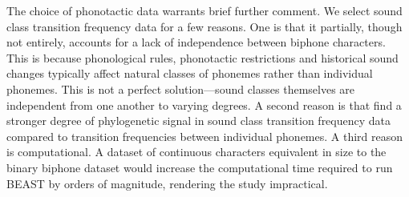 \documentclass[]{article}
\begin{document}
The choice of phonotactic data warrants brief further comment. We select sound class transition frequency data for a few reasons. One is that it partially, though not entirely, accounts for a lack of independence between biphone characters. This is because phonological rules, phonotactic restrictions and historical sound changes typically affect natural classes of phonemes rather than individual phonemes. This is not a perfect solution---sound classes themselves are independent from one another to varying degrees. A second reason is that \textcite{macklin-cordes_phylogenetic_2020} find a stronger degree of phylogenetic signal in sound class transition frequency data compared to transition frequencies between individual phonemes. A third reason is computational. A dataset of continuous characters equivalent in size to the binary biphone dataset would increase the computational time required to run BEAST by orders of magnitude, rendering the study impractical.
\end{document}
